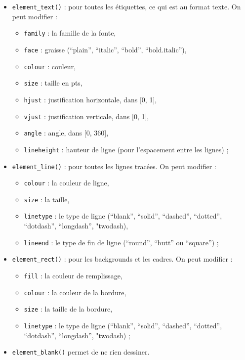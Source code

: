 \documentclass[
  11pt,
]{book}
\providecommand{\tightlist}{%
  \setlength{\itemsep}{0pt}\setlength{\parskip}{0pt}}
\numberwithin{equation}{section}
\numberwithin{countremarque}{section}
\begin{document}
\begin{itemize}
\item
  \texttt{element\_text()} : pour toutes les étiquettes, ce qui est au format texte. On peut modifier :

  \begin{itemize}
  \tightlist
  \item
    \texttt{family} : la famille de la fonte,
  \item
    \texttt{face} : graisse (``plain'', ``italic'', ``bold'', ``bold.italic''),
  \item
    \texttt{colour} : couleur,
  \item
    \texttt{size} : taille en pts,
  \item
    \texttt{hjust} : justification horizontale, dans {[}0, 1{]},
  \item
    \texttt{vjust} : justification verticale, dans {[}0, 1{]},
  \item
    \texttt{angle} : angle, dans {[}0, 360{]},
  \item
    \texttt{lineheight} : hauteur de ligne (pour l'espacement entre les lignes) ;
  \end{itemize}
\item
  \texttt{element\_line()} : pour toutes les lignes tracées. On peut modifier :

  \begin{itemize}
  \tightlist
  \item
    \texttt{colour} : la couleur de ligne,
  \item
    \texttt{size} : la taille,
  \item
    \texttt{linetype} : le type de ligne (``blank'', ``solid'', ``dashed'', ``dotted'', ``dotdash'', ``longdash'', "twodash),
  \item
    \texttt{lineend} : le type de fin de ligne (``round'', ``butt'' ou ``square'') ;
  \end{itemize}
\item
  \texttt{element\_rect()} : pour les backgrounds et les cadres. On peut modifier :

  \begin{itemize}
  \tightlist
  \item
    \texttt{fill} : la couleur de remplissage,
  \item
    \texttt{colour} : la couleur de la bordure,
  \item
    \texttt{size} : la taille de la bordure,
  \item
    \texttt{linetype} : le type de ligne (``blank'', ``solid'', ``dashed'', ``dotted'', ``dotdash'', ``longdash'', "twodash) ;
  \end{itemize}
\item
  \texttt{element\_blank()} permet de ne rien dessiner.
\end{itemize}
\end{document}
